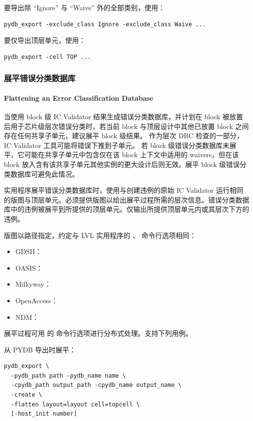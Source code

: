 要导出除 ``Ignore'' 与 ``Waive'' 外的全部类别，使用：
\begin{lstlisting}[style=shell]
pydb_export -exclude_class Ignore -exclude_class Waive ...
\end{lstlisting}

要仅导出顶层单元，使用：
\begin{lstlisting}[style=shell]
pydb_export -cell TOP ...
\end{lstlisting}

\subsubsection{展平错误分类数据库}
\paragraph*{Flattening an Error Classification Database}

当使用 block 级 IC Validator 结果生成错误分类数据库，并计划在 block 被放置后用于芯片级层次错误分类时，若当前 block 与顶层设计中其他已放置 block 之间存在任何共享子单元，建议展平 block 级结果。
作为层次 DRC 检查的一部分，IC Validator 工具可能将错误下推到子单元。
若 block 级错误分类数据库未展平，它可能在共享子单元中包含仅在该 block 上下文中适用的 waivers，但在该 block 放入含有该共享子单元其他实例的更大设计后则无效。展平 block 级错误分类数据库可避免此情况。

 实用程序展平错误分类数据库时，使用与创建违例的原始 IC Validator 运行相同的版图与顶层单元。必须提供版图以给出展平过程所需的层次信息。错误分类数据库中的违例被展平到所提供的顶层单元。仅输出所提供顶层单元内或其层次下方的违例。

版图以路径指定，约定与 LVL 实用程序的 、 命令行选项相同：
\begin{itemize}
  \item GDSII：
  \item OASIS：
  \item Milkyway：
  \item OpenAccess：
  \item NDM：
\end{itemize}

展平过程可用  的  命令行选项进行分布式处理。支持下列用例。

从 PYDB 导出时展平：
\begin{lstlisting}[style=shell]
pydb_export \
  -pydb_path path -pydb_name name \
  -cpydb_path output_path -cpydb_name output_name \
  -create \
  -flatten layout=layout cell=topcell \
  [-host_init number]
\end{lstlisting}

